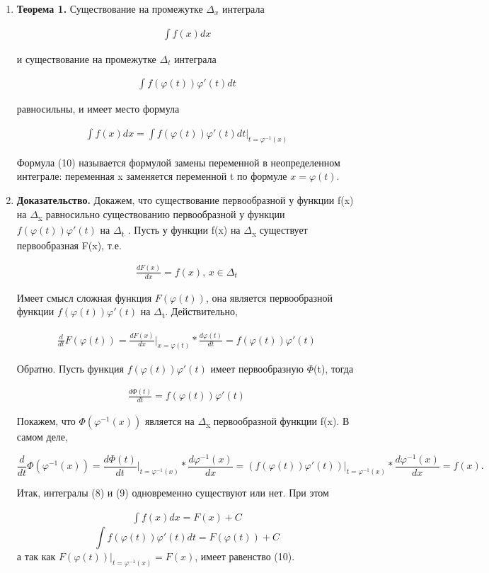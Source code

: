 \documentclass[11pt]{article}
\begin{document}
\begin{enumerate}
\item \textbf{Теорема 1.}
\label{sec:org98823af}
Существование на промежутке \(\Delta_x\) интеграла

  \begin{eqnarray}
\int f(x)dx
  \end{eqnarray}

и существование на промежутке \(\Delta_t\) интеграла

  \begin{eqnarray}
\int f(\varphi(t))\varphi'(t)dt
  \end{eqnarray}

равносильны, и имеет место формула

  \begin{eqnarray}
\int f(x)dx=\int f(\varphi(t))\varphi'(t)dt\bigg|_{t=\varphi^{-1}(x)}
  \end{eqnarray}

Формула (10) называется формулой замены переменной в неопределенном интеграле:
переменная x заменяется переменной t по формуле \(x = \varphi(t)\).
\item \textbf{Доказательство.}
\label{sec:org7b72871}
Докажем, что существование первообразной у функции f(x) на
 \(\Delta\)\textsubscript{x} равносильно существованию первообразной у функции \(f(\varphi(t))\varphi'(t)\)  на \(\Delta\)\textsubscript{t}
 . Пусть у функции f(x) на \(\Delta\)\textsubscript{x} существует первообразная F(x), т.е.

\begin{eqnarray}
\frac{dF(x)}{dx} = f(x)\text{, } x\in\Delta_t
\end{eqnarray}

Имеет смысл сложная функция \(F(\varphi(t))\), она является первообразной функции \(f(\varphi(t))\varphi'(t)\) на \(\Delta\)\textsubscript{t}. 
Действительно,

\begin{eqnarray}
\frac{d}{dt}F(\varphi(t))=\frac{dF(x)}{dx}\bigg|_{x=\varphi(t)}*\frac{d\varphi(t)}{dt}=f(\varphi(t))\varphi'(t)
\end{eqnarray}

Обратно. Пусть функция \(f(\varphi(t))\varphi'(t)\) имеет первообразную \(\Phi\)(t), тогда

\begin{eqnarray}
 \frac{d\Phi(t)}{dt}=f(\varphi(t))\varphi'(t)
 \end{eqnarray}

Покажем, что  \(\Phi(\varphi^{-1}(x))\) является на \(\Delta\)\textsubscript{x} первообразной функции f(x). В самом
деле,

$$
 \frac{d}{dt}\Phi(\varphi^{-1}(x))=\frac{d\Phi(t)}{dt}\bigg|_{t=\varphi^{-1}(x)}*\frac{d\varphi^{-1}(x)}{dx}=
(f(\varphi(t))\varphi'(t))\bigg|_{t=\varphi^{-1}(x)}*\frac{d\varphi^{-1}(x)}{dx}=f(x).
$$

Итак, интегралы (8) и (9) одновременно существуют или нет. При этом

\begin{eqnarray}
 \int f(x)dx=F(x)+C
 \end{eqnarray}
$$
\int f(\varphi(t))\varphi'(t)dt=F(\varphi(t))+C
$$
 а так как \(F(\varphi(t))|_{t=\varphi^{-1}(x)}=F(x)\), имеет равенство (10).
\end{enumerate}
\end{document}
